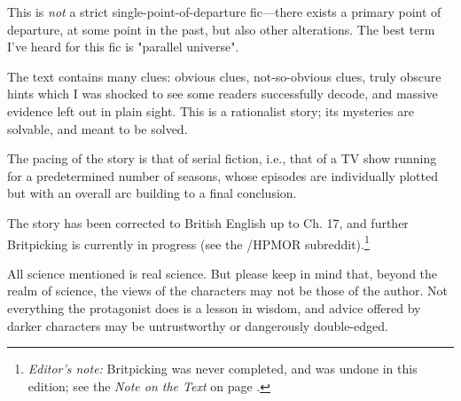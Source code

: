 This is \emph{not} a strict single-point-of-departure fic---there exists a
primary point of departure, at some point in the past, but also other
alterations. The best term I've heard for this fic is "parallel universe".

The text contains many clues: obvious clues, not-so-obvious clues, truly
obscure hints which I was shocked to see some readers successfully decode, and
massive evidence left out in plain sight. This is a rationalist story; its
mysteries are solvable, and meant to be solved.

The pacing of the story is that of serial fiction, i.e., that of a TV show
running for a predetermined number of seasons, whose episodes are individually
plotted but with an overall arc building to a final conclusion.

The story has been corrected to British English up to Ch. 17, and further
Britpicking is currently in progress (see the /HPMOR
subreddit).\footnote{\emph{Editor's note:} Britpicking was never completed, and
    was undone in this edition; see the \emph{Note on the Text} on page
    \pageref{britpick note}.}

All science mentioned is real science. But please keep in mind that, beyond the
realm of science, the views of the characters may not be those of the author.
Not everything the protagonist does is a lesson in wisdom, and advice offered
by darker characters may be untrustworthy or dangerously double-edged.
